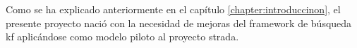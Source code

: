 
\begin{comment}
En esta sección se detalla la situación actual de la organización y las necesidades de la misma, que originan el desarrollo o mejora de un sistema informático. Luego se presentan los objetivos y el catálogo de requisitos del nuevo sistema. Finalmente se describen las diferentes alternativas tecnológicas y el análisis de la brecha entre los requisitos planteados y la solución base seleccionada, si aplica.
\end{comment}

\label{chapter:requisitos}

\section{}
\begin{comment}
Esta sección debe contener información sobre la situación
actual de la organización para la que se va a desarrollar el sistema software.
\end{comment}
Como se ha explicado anteriormente en el capítulo \ref{chapter:introduccinon}, el presente proyecto nació con la necesidad de mejoras del \gls{framework} de búsqueda \gls{kf} aplicándose como modelo piloto al proyecto \gls{strada}.

\begin{comment}
\question{que situación actual de la organización y las necesidades de la misma, que originan el desarrollo o mejora de un sistema informático?? expuesto en la introducción \ref{section:alcance}}
\end{comment}

\subsection{}
\begin{comment}
Esta sección debe contener información sobre los modelos de procesos de negocio actuales, que suelen ser la base de los modelos de procesos de negocio a implantar.
\end{comment}


